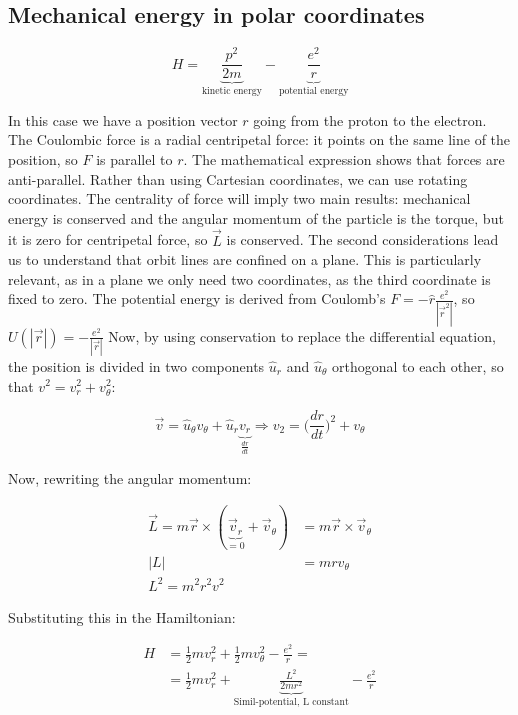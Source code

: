   \subsection{Mechanical energy in polar coordinates}

  $$H = \underbrace{\frac{p^2}{2m}}_{\text{kinetic energy}}-\underbrace{\frac{e^2}{r}}_{\text{potential energy}}$$

  In this case we have a position vector $r$ going from the proton to the electron.
  The Coulombic force is a radial centripetal force: it points on the same line of the position, so $F$ is parallel to $r$.
  The mathematical expression shows that forces are anti-parallel.
  Rather than using Cartesian coordinates, we can use rotating coordinates.
  The centrality of force will imply two main results: mechanical energy is conserved and the angular momentum  of the particle is the torque, but it is zero for centripetal force, so $\vec{L}$ is conserved.
  The second considerations lead us to understand that orbit lines are confined on a plane. This is particularly relevant, as in a plane we only need two coordinates, as the third coordinate is fixed to zero.
  The potential energy is derived from Coulomb's $F=-\hat{r}\frac{e^2}{|\vec{r}^2|}$, so $U(|\vec{r}|) = -\frac{e^2}{|\vec{r}|}$
  Now, by using conservation to replace the differential equation, the position is divided in two components $\hat{u}_r$ and $\hat{u}_\theta$ orthogonal to each other, so that $v^2 = v_r^2+v_\theta^2$:

  $$\vec{v} = \hat{u}_\theta v_\theta +\hat{u}_r\underbrace{v_r}_{\frac{d{r}}{d{t}}}\Rightarrow v_2 = \biggl(\frac{d{r}}{d{t}}\biggr)^2+v_\theta$$

  Now, rewriting the angular momentum:

  \begin{align*}
    \vec{L} = m \vec{r}\times(\underbrace{\vec{v}_r}_{=0}+\vec{v}_\theta) &= m \vec{r}\times\vec{v}_\theta\\
    |L| &= mrv_\theta\\
    L^2 = m^2r^2v^2
  \end{align*}

  Substituting this in the Hamiltonian:

  \begin{align*}
    H &= \frac{1}{2}mv_r^2 + \frac{1}{2}mv_\theta^2 - \frac{e^2}{r}=\\
      &=\frac{1}{2}mv_r^2 + \underbrace{\frac{L^2}{2mr^2}}_{\text{Simil-potential, L constant}} - \frac{e^2}{r}
  \end{align*}

